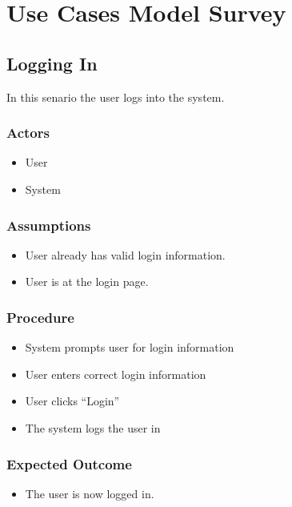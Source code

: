 \chapter{Use Cases Model Survey}
{
    \renewcommand*{\theenumi}{\thesubsection.\arabic{enumi}}
    \renewcommand*{\theenumii}{\theenumi.\arabic{enumii}}
    \renewcommand*{\theenumiii}{\theenumii.\arabic{enumiii}}

    \section{Logging In}
        In this senario the user logs into the system.
        \subsection{Actors}
            \begin{itemize}
                \item User
                \item System
            \end{itemize}
        \subsection{Assumptions}
            \begin{itemize}
                \item User already has valid login information.
                \item User is at the login page.
            \end{itemize}
        \subsection{Procedure}
            \begin{itemize}
                \item System prompts user for login information
                \item User enters correct login information
                \item User clicks ``Login''
                \item The system logs the user in
            \end{itemize}
        \subsection{Expected Outcome}
            \begin{itemize}
                \item The user is now logged in.
            \end{itemize}

}
